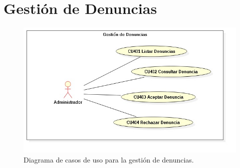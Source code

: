 \section{Gesti\'{o}n de Denuncias}

\begin{figure}[h]
\centering
\includegraphics[width=1\textwidth]{Img/CasosDeUso/DCU04.jpg}
\caption{Diagrama de casos de uso para la gesti\'{o}n de denuncias.}
\label{fig:dcu}
\end{figure}
